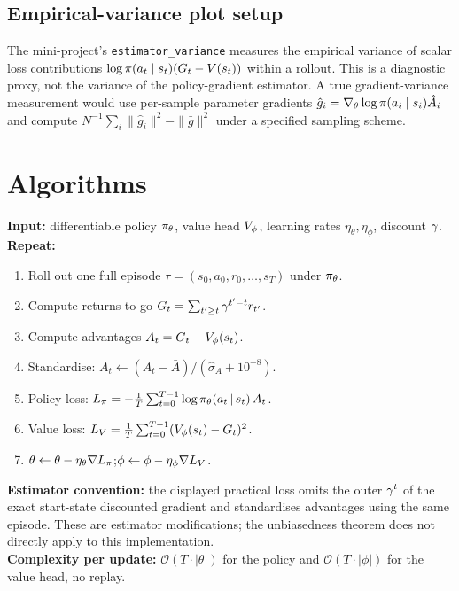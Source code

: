 \documentclass[11pt,oneside]{scrbook}
\begin{document}
\section{Empirical-variance plot setup}

The mini-project's \texttt{estimator\_variance} measures the empirical
variance of scalar loss contributions $\log\pi(a_t\mid s_t)(G_t-V(s_t))$
within a rollout. This is a diagnostic proxy, not the variance of the
policy-gradient estimator. A true gradient-variance measurement would use
per-sample parameter gradients
$\hat g_i=\nabla_\theta\log\pi(a_i\mid s_i)\hat A_i$ and compute
$N^{-1}\sum_i\|\hat g_i\|^2-\|\bar g\|^2$ under a specified sampling scheme.

\chapter{Algorithms}

\begin{tcolorbox}[colback=rlbg, colframe=rlblue, title=\textbf{REINFORCE with learned baseline (Williams 1992 + V-baseline)}]
\textbf{Input:} differentiable policy $\pi_\theta$, value head $V_\phi$, learning rates $\eta_\theta, \eta_\phi$, discount $\gamma$.\\
\textbf{Repeat:}
\begin{enumerate}[leftmargin=*]
  \item Roll out one full episode $\tau = (s_0, a_0, r_0, \ldots, s_T)$ under $\pi_\theta$.
  \item Compute returns-to-go $G_t = \sum_{t'\ge t} \gamma^{t'-t} r_{t'}$.
  \item Compute advantages $A_t = G_t - V_\phi(s_t)$.
  \item Standardise: $A_t \leftarrow (A_t - \bar A)/(\hat\sigma_A + 10^{-8})$.
  \item Policy loss: $L_\pi = -\frac{1}{T}\sum_{t=0}^{T-1} \log \pi_\theta(a_t\,\vert\, s_t)\, A_t$.
  \item Value loss: $L_V = \frac{1}{T}\sum_{t=0}^{T-1} (V_\phi(s_t) - G_t)^2$.
  \item $\theta \leftarrow \theta - \eta_\theta \nabla L_\pi$;\quad $\phi \leftarrow \phi - \eta_\phi \nabla L_V$.
\end{enumerate}
\textbf{Estimator convention:} the displayed practical loss omits the outer
$\gamma^t$ of the exact start-state discounted gradient and standardises
advantages using the same episode. These are estimator modifications;
the unbiasedness theorem does not directly apply to this implementation.\\
\textbf{Complexity per update:} $\mathcal{O}(T \cdot |\theta|)$ for the policy and $\mathcal{O}(T \cdot |\phi|)$ for the value head, no replay.
\end{tcolorbox}
\end{document}
